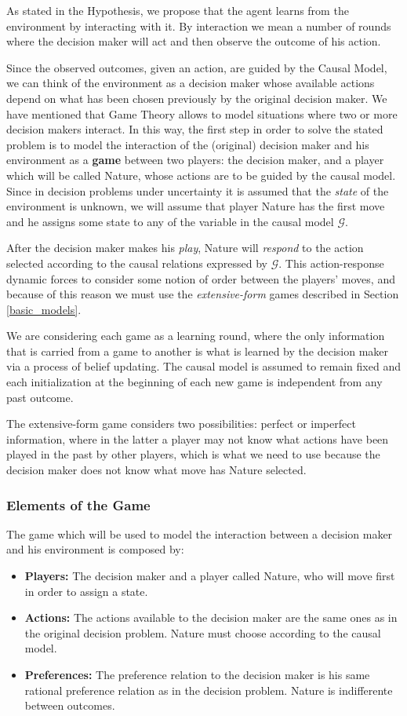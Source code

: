 \documentclass[english,letterpaper,12pt,final]{article}
\theoremstyle{definition}
\begin{document}
As stated in the Hypothesis, we propose that the agent learns from the environment by interacting with it. By interaction we mean a number of rounds where the decision maker will act and then observe the outcome of his action. 

Since the observed outcomes, given an action, are guided by the Causal Model, we can think of the environment as a decision maker whose available actions depend on what has been chosen previously by the original decision maker. We have mentioned that Game Theory allows to model situations where two or more decision makers interact. In this way, the first step in order to solve the stated problem is to model the interaction of the (original) decision maker and his environment as a \textbf{game} between two players: the decision maker, and a player which will be called Nature, whose actions are to be guided by the causal model. Since in decision problems under uncertainty it is assumed that the \textit{state} of the environment is unknown, we will assume that player Nature has the first move and he assigns some state to any of the variable in the causal model $\mathcal{G}$.

After the decision maker makes his \textit{play}, Nature will \textit{respond} to the action selected according to the causal relations expressed by $\mathcal{G}$. This action-response dynamic forces to consider some notion of order between the players' moves, and because of this reason we must use the \textit{extensive-form} games described in Section \ref{basic_models}.

We are considering each game as a learning round, where the only information that is carried from a game to another is what is learned by the decision maker via a process of belief updating. The causal model is assumed to remain fixed and each initialization at the beginning of each new game is independent from any past outcome.

The extensive-form game considers two possibilities: perfect or imperfect information, where in the latter a player may not know what actions have been played in the past by other players, which is what we need to use because the decision maker does not know what move has Nature selected. 
\subsubsection{Elements of the Game}
The game which will be used to model the interaction between a decision maker and his environment is composed by:
\begin{itemize}
\item \textbf{Players:} The decision maker and a player called Nature, who will move first in order to assign a state.
\item \textbf{Actions:} The actions available to the decision maker are the same ones as in the original decision problem. Nature must choose according to the causal model.
\item \textbf{Preferences:} The preference relation to the decision maker is his same rational preference relation as in the decision problem. Nature is indifferente between outcomes.
\end{itemize}
\end{document}

